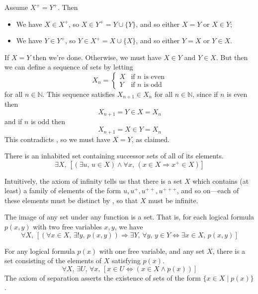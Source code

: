 \begin{cproof}
Assume $X^+=Y^+$. Then
\begin{itemize}
\item We have $X \in X^+$, so $X \in Y^+ = Y \cup \{ Y \}$, and so either $X = Y$ or $X \in Y$;
\item We have $Y \in Y^+$, so $Y \in X^+ = X \cup \{ X \}$, and so either $Y = X$ or $Y \in X$.
\end{itemize}
If $X=Y$ then we're done. Otherwise, we must have $X \in Y$ and $Y \in X$. But then we can define a sequence of sets by letting
\[ X_n = \begin{cases} X & \text{if } n \text{ is even} \\ Y & \text{if } n \text{ is odd} \end{cases} \]
for all $n \in \mathbb{N}$. This sequence satisfies $X_{n+1} \in X_n$ for all $n \in \mathbb{N}$, since if $n$ is even then
\[ X_{n+1} = Y \in X = X_n \]
and if $n$ is odd then
\[ X_{n+1} = X \in Y = X_n \]
This contradicts , so we must have $X=Y$, as claimed.
\end{cproof}

\begin{axiom}
\label{axZFCInfinity}
There is an inhabited set containing successor sets of all of its elements.
\[ \exists X,\, [(\exists u,\, u \in X) \wedge \forall x,\, (x \in X \Rightarrow x^+ \in X)] \]
\end{axiom}

Intuitively, the axiom of infinity tells us that there is a set $X$ which contains (at least) a family of elements of the form $u, u^+, u^{++}, u^{+++}$, and so on---each of these elements must be distinct by , so that $X$ must be infinite.

\begin{axiom}
\label{axZFCReplacement}
The image of any set under any function is a set. That is, for each logical formula $p(x,y)$ with two free variables $x,y$, we have
\[ \forall X,\, [(\forall x \in X,\, \exists ! y,\, p(x,y)) \Rightarrow \exists Y,\, \forall y,\, y \in Y \Leftrightarrow \exists x \in X,\, p(x,y)] \]
\end{axiom}

\begin{axiom}
\label{axZFCSeparation}
For any logical formula $p(x)$ with one free variable, and any set $X$, there is a set consisting of the elements of $X$ satisfying $p(x)$.
\[ \forall X,\, \exists U,\, \forall x,\, [x \in U \Leftrightarrow (x \in X \wedge p(x))] \]
The axiom of separation asserts the existence of sets of the form $\{ x \in X \mid p(x) \}$.
\end{axiom}

